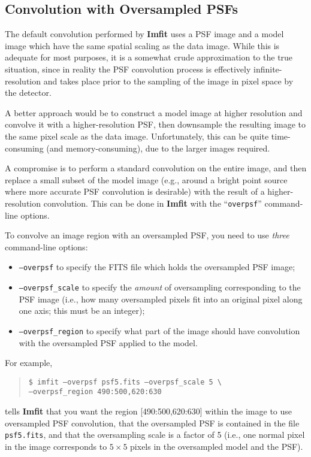 \documentclass[10pt,a4paper,article]{memoir}
\newcommand{\imfit}{\textbf{Imfit}}
\begin{document}
\subsection{Convolution with Oversampled PSFs}

The default convolution performed by \imfit{} uses a PSF image and a
model image which have the same spatial scaling as the data image. While
this is adequate for most purposes, it is a somewhat crude approximation
to the true situation, since in reality the PSF convolution process is
effectively infinite-resolution and takes place prior to the sampling
of the image in pixel space by the detector.

A better approach would be to construct a model image at higher resolution
and convolve it with a higher-resolution PSF, then downsample the resulting
image to the same pixel scale as the data image. Unfortunately, this can be
quite time-consuming (and memory-consuming), due to the larger
images required. 

A compromise is to perform a standard convolution on the entire image, and
then replace a small subset of the model image (e.g., around a bright
point source where more accurate PSF convolution is desirable) with the
result of a higher-resolution convolution. This can be done in \imfit{}
with the ``\texttt{overpsf}'' command-line options.

To convolve an image region with an oversampled PSF, you need to use \textit{three}
command-line options:
\begin{itemize}
\item \texttt{--overpsf} to specify the FITS file which holds the oversampled PSF image;
\item \texttt{--overpsf\_scale} to specify the \textit{amount} of oversampling corresponding
to the PSF image (i.e., how many oversampled pixels fit into an original pixel along
one axis; this must be an integer);
\item \texttt{--overpsf\_region} to specify what part of the image should have convolution
with the oversampled PSF applied to the model.
\end{itemize}
For example, 
\begin{quote}
\texttt{\$ imfit --overpsf psf5.fits --overpsf\_scale 5 \textbackslash \\
         --overpsf\_region 490:500,620:630}
\end{quote}
tells \imfit{} that you want the region [490:500,620:630] within the
image to use oversampled PSF convolution, that the oversampled PSF is
contained in the file \texttt{psf5.fits}, and that the oversampling
scale is a factor of 5 (i.e., one normal pixel in the image corresponds
to $5 \times 5$ pixels in the oversampled model and the PSF).
\end{document}
